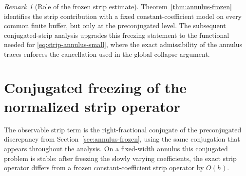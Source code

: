 \documentclass[11pt,a4paper]{amsart}
\theoremstyle{plain}
\theoremstyle{definition}
\theoremstyle{remark}
\newtheorem{remark}[theorem]{Remark}
\begin{document}
\begin{remark}[Role of the frozen strip estimate]
\label{rem:annulus-frozen}
Theorem~\ref{thm:annulus-frozen} identifies the strip contribution with a fixed constant-coefficient
model on every common finite buffer, but only at the preconjugated level. The subsequent
conjugated-strip analysis upgrades this freezing statement to the functional needed for
\eqref{eq:strip-annulus-small}, where the exact admissibility of the annulus traces enforces the
cancellation used in the global collapse argument.
\end{remark}

\section{Conjugated freezing of the normalized strip operator}
\label{sec:annulus-conjugated}

The observable strip term is the right-fractional conjugate of the preconjugated discrepancy from
Section~\ref{sec:annulus-frozen}, using the same conjugation that appears throughout the analysis.
On a fixed-width annulus this conjugated problem is stable: after freezing the slowly varying
coefficients, the exact strip operator differs from a frozen constant-coefficient strip operator by
\(O(h)\).
\end{document}
